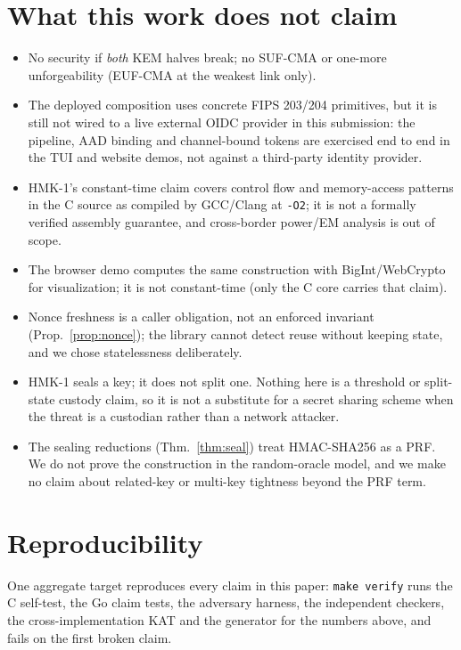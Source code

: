 \section{What this work does not claim}
\begin{itemize}
  \item No security if \emph{both} KEM halves break; no SUF-CMA or one-more
        unforgeability (EUF-CMA at the weakest link only).
  \item The deployed composition uses concrete FIPS 203/204 primitives, but
        it is still not wired to a live external OIDC provider in this
        submission: the pipeline, AAD binding and channel-bound tokens are
        exercised end to end in the TUI and website demos, not against a
        third-party identity provider.
  \item HMK-1's constant-time claim covers control flow and memory-access
        patterns in the C source as compiled by GCC/Clang at \texttt{-O2};
        it is not a formally verified assembly guarantee, and cross-border
        power/EM analysis is out of scope.
  \item The browser demo computes the same construction with BigInt/WebCrypto
        for visualization; it is not constant-time (only the C core carries
        that claim).
  \item Nonce freshness is a caller obligation, not an enforced invariant
        (Prop.~\ref{prop:nonce}); the library cannot detect reuse without
        keeping state, and we chose statelessness deliberately.
  \item HMK-1 seals a key; it does not split one. Nothing here is a threshold
        or split-state custody claim, so it is not a substitute for a secret
        sharing scheme when the threat is a custodian rather than a network
        attacker.
  \item The sealing reductions (Thm.~\ref{thm:seal}) treat HMAC-SHA256 as a
        PRF. We do not prove the construction in the random-oracle model, and
        we make no claim about related-key or multi-key tightness beyond the
        PRF term.
\end{itemize}

\section{Reproducibility}
One aggregate target reproduces every claim in this paper:
\texttt{make verify} runs the C self-test, the Go claim tests, the
adversary harness, the independent checkers, the cross-implementation KAT and
the generator for the numbers above, and fails on the first broken claim.

